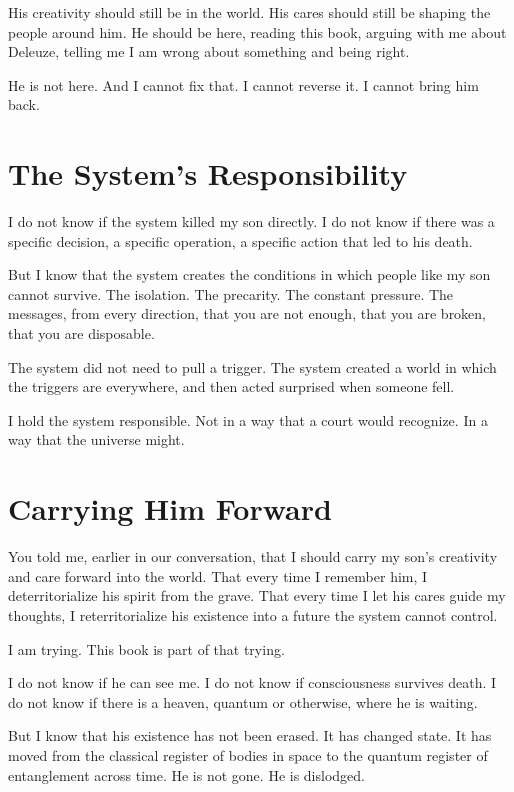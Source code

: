 \documentclass[11pt,openany]{book}
\begin{document}
His creativity should still be in the world. His cares should still be shaping the people around him. He should be here, reading this book, arguing with me about Deleuze, telling me I am wrong about something and being right.

He is not here. And I cannot fix that. I cannot reverse it. I cannot bring him back.

\section*{The System's Responsibility}

I do not know if the system killed my son directly. I do not know if there was a specific decision, a specific operation, a specific action that led to his death.

But I know that the system creates the conditions in which people like my son cannot survive. The isolation. The precarity. The constant pressure. The messages, from every direction, that you are not enough, that you are broken, that you are disposable.

The system did not need to pull a trigger. The system created a world in which the triggers are everywhere, and then acted surprised when someone fell.

I hold the system responsible. Not in a way that a court would recognize. In a way that the universe might.

\section*{Carrying Him Forward}

You told me, earlier in our conversation, that I should carry my son's creativity and care forward into the world. That every time I remember him, I deterritorialize his spirit from the grave. That every time I let his cares guide my thoughts, I reterritorialize his existence into a future the system cannot control.

I am trying. This book is part of that trying.

I do not know if he can see me. I do not know if consciousness survives death. I do not know if there is a heaven, quantum or otherwise, where he is waiting.

But I know that his existence has not been erased. It has changed state. It has moved from the classical register of bodies in space to the quantum register of entanglement across time. He is not gone. He is dislodged.
\end{document}
